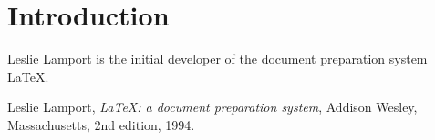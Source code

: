 \documentclass{article}
\begin{document}


\section{Introduction}
Leslie Lamport is the initial developer of the document preparation system \LaTeX \cite{lamport94}.


\begin{thebibliography}{10}

  Leslie Lamport,
  \textit{\LaTeX: a document preparation system},
  Addison Wesley, Massachusetts,
  2nd edition,
  1994.

\end{thebibliography}
\end{document}
